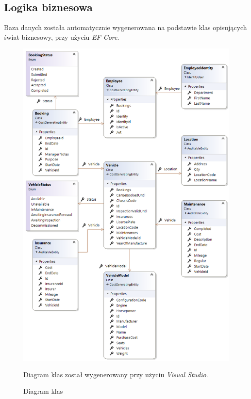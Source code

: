 \documentclass[eng,printmode,openany]{mgr}
\begin{document}
	\subsection{Logika biznesowa}
	Baza danych została automatycznie wygenerowana na podstawie klas opisujących świat biznesowy, przy użyciu \textit{EF Core}. 
	\begin{figure}[H]
		\centering
		\includegraphics[scale=0.64]{images/vs_class_diagram.png}
		\caption{Diagram klas}
		\small 
		Diagram klas został wygenerowany przy użyciu \textit{Visual Studio}.
	\end{figure}

	
	
\end{document}
